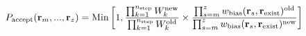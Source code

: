 \documentclass[12pt]{article}
\begin{document}
\begin{displaymath}
P_{\rm accept} ({\bf r}_m, ..., {\bf r}_z)
 = {\rm Min}\left[1,
{
{\prod_{k=1}^{n_{\rm step}} W_{k}^{\rm new}}
\over
{\prod_{k=1}^{n_{\rm step}} W_{k}^{\rm old}}
}
\times
{
{\prod_{s=m}^{z} w_{\rm bias}({{\bf r}_s},{\bf r}_{\rm exist})^{\rm old}}
\over
{\prod_{s=m}^{z} w_{\rm bias}({{\bf r}_s},{\bf r}_{\rm exist})^{\rm new}}
}
\right]
\end{displaymath}
\end{document}
